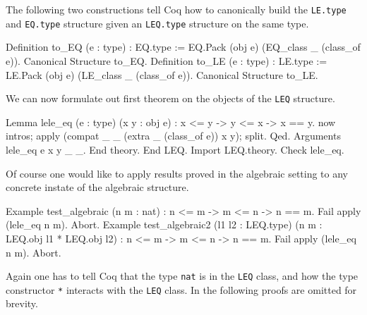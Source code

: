 The following two constructions tell Coq how to canonically build
the \texttt{LE.type} and \texttt{EQ.type} structure given an \texttt{LEQ.type} structure
on the same type.

\begin{coq_example}
  Definition to_EQ (e : type) : EQ.type :=
    EQ.Pack (obj e) (EQ_class _ (class_of e)).
  Canonical Structure to_EQ.
  Definition to_LE (e : type) : LE.type :=
    LE.Pack (obj e) (LE_class _ (class_of e)).
  Canonical Structure to_LE.
\end{coq_example}
We can now formulate out first theorem on the objects of the \texttt{LEQ} structure.
\begin{coq_example}
  Lemma lele_eq (e : type) (x y : obj e) : x <= y -> y <= x -> x == y.
   now intros; apply (compat _ _ (extra _ (class_of e)) x y); split. Qed.
  Arguments lele_eq {e} x y _ _.
  End theory.
End LEQ.
Import LEQ.theory.
Check lele_eq.
\end{coq_example}

Of course one would like to apply results proved in the algebraic
setting to any concrete instate of the algebraic structure.

\begin{coq_example}
Example test_algebraic (n m : nat) :  n <= m -> m <= n -> n == m.
 Fail apply (lele_eq n m). Abort.
Example test_algebraic2 (l1 l2 : LEQ.type) (n m : LEQ.obj l1 * LEQ.obj l2) :
  n <= m -> m <= n -> n == m.
 Fail apply (lele_eq n m). Abort.
\end{coq_example}

Again one has to tell Coq that the type \texttt{nat} is in the \texttt{LEQ} class, and how
the type constructor \texttt{*} interacts with the \texttt{LEQ} class.  In the following
proofs are omitted for brevity.

